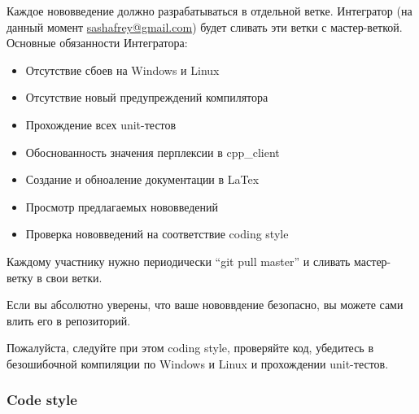 \documentclass[12pt]{article}
\begin{document}
Каждое нововведение должно разрабатываться в отдельной ветке. Интегратор (на данный момент \href{mailto:sashafrey@gmail.com}{sashafrey@gmail.com}) будет сливать эти ветки с мастер-веткой. Основные обязанности Интегратора:
\begin{itemize}
    \item Отсутствие сбоев на Windows и Linux
    \item Отсутствие новый предупреждений компилятора
    \item Прохождение всех unit-тестов
    \item Обоснованность значения перплексии в cpp\_client
    \item Создание и обноаление документации в LaTex
    \item Просмотр предлагаемых нововведений
    \item Проверка нововведений на соответствие coding style
\end{itemize}

Каждому участнику нужно периодически ``git pull master'' и сливать мастер-ветку в свои ветки.

Если вы абсолютно уверены, что ваше нововвдение безопасно, вы можете сами влить его в репозиторий.

Пожалуйста, следуйте при этом coding style, проверяйте код, убедитесь в безошибочной компиляции по Windows и Linux и прохождении unit-тестов.

\subsubsection{Code style}
\end{document}
